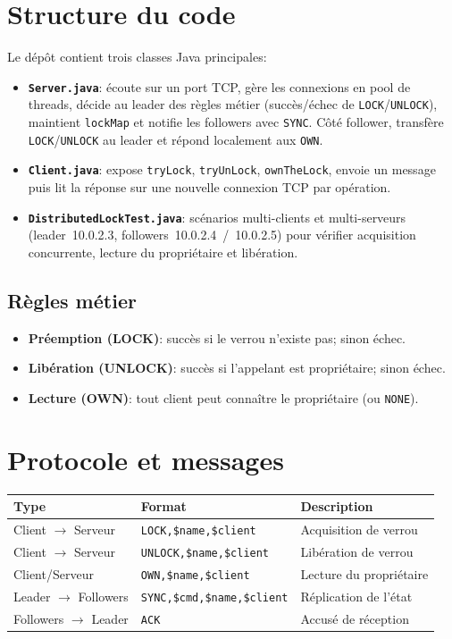 \documentclass[a4paper,11pt]{article}
\begin{document}
\section{Structure du code}
Le dépôt contient trois classes Java principales:
\begin{itemize}
\item \textbf{\texttt{Server.java}}: écoute sur un port TCP, gère les connexions en pool de threads, décide au leader des règles métier (succès/échec de \texttt{LOCK}/\texttt{UNLOCK}), maintient \texttt{lockMap} et notifie les followers avec \texttt{SYNC}. Côté follower, transfère \texttt{LOCK}/\texttt{UNLOCK} au leader et répond localement aux \texttt{OWN}.
\item \textbf{\texttt{Client.java}}: expose \texttt{tryLock}, \texttt{tryUnLock}, \texttt{ownTheLock}, envoie un message puis lit la réponse sur une nouvelle connexion TCP par opération.
\item \textbf{\texttt{DistributedLockTest.java}}: scénarios multi-clients et multi-serveurs (leader 10.0.2.3, followers 10.0.2.4 / 10.0.2.5) pour vérifier acquisition concurrente, lecture du propriétaire et libération.
\end{itemize}

\subsection*{Règles métier}
\begin{itemize}
\item \textbf{Préemption (LOCK)}: succès si le verrou n'existe pas; sinon échec.
\item \textbf{Libération (UNLOCK)}: succès si l'appelant est propriétaire; sinon échec.
\item \textbf{Lecture (OWN)}: tout client peut connaître le propriétaire (ou \texttt{NONE}).
\end{itemize}

\section{Protocole et messages}
\begin{center}
\begin{tabular}{|l|l|l|}
\hline
\textbf{Type} & \textbf{Format} & \textbf{Description}\\\hline
Client $\rightarrow$ Serveur & \texttt{LOCK,\$name,\$client} & Acquisition de verrou\\\hline
Client $\rightarrow$ Serveur & \texttt{UNLOCK,\$name,\$client} & Libération de verrou\\\hline
Client/Serveur & \texttt{OWN,\$name,\$client} & Lecture du propriétaire\\\hline
Leader $\rightarrow$ Followers & \texttt{SYNC,\$cmd,\$name,\$client} & Réplication de l'état\\\hline
Followers $\rightarrow$ Leader & \texttt{ACK} & Accusé de réception\\\hline
\end{tabular}
\end{center}
\end{document}

